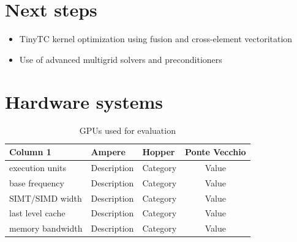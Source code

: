\documentclass[a4paper,12pt]{article}
\begin{document}
\section{Next steps}

\begin{itemize}
    \item TinyTC kernel optimization using fusion and cross-element vectoritation
    \item Use of advanced multigrid solvers and preconditioners
\end{itemize}


\section{Hardware systems}

\begin{center}
    \begin{table}[h!]
    \small
    \caption{GPUs used for evaluation}
    \renewcommand{\arraystretch}{1.25}
    \label{tab:example_table}
    \begin{tabular}{|l|l|l|c|}
    \hline
    \textbf{Column 1} & \textbf{Ampere} & \textbf{Hopper} & \textbf{Ponte Vecchio} \\
    \hline
    execution units & Description & Category & Value \\
    base frequency & Description & Category & Value \\
    SIMT/SIMD width & Description & Category & Value \\
    last level cache & Description & Category & Value \\
    memory bandwidth & Description & Category & Value \\
    \hline
    \end{tabular}
    \end{table}
\end{center}
\end{document}
